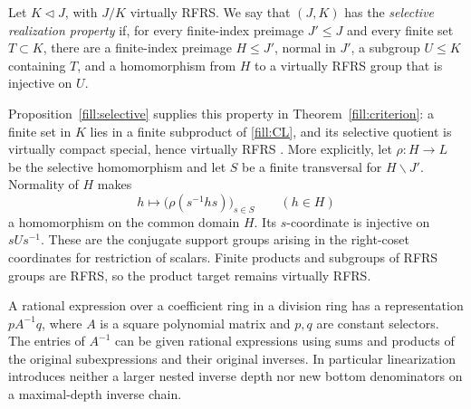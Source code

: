 \begin{definition}\label{fill:selective-input}
Let \(K\lhd J\), with \(J/K\) virtually RFRS.
We say that \((J,K)\) has the \emph{selective realization property} if,
for every finite-index preimage \(J'\le J\) and every finite set
\(T\subset K\), there are a finite-index preimage \(H\le J'\), normal
in \(J'\), a subgroup \(U\le K\) containing \(T\), and a homomorphism
from \(H\) to a virtually RFRS group that is injective on \(U\).
\end{definition}

Proposition~\ref{fill:selective} supplies this property in
Theorem~\ref{fill:criterion}: a finite set in \(K\) lies in a finite
subproduct of \eqref{fill:CL}, and its selective quotient is virtually
compact special, hence virtually RFRS \cite{Agol2008}.
More explicitly, let \(\rho:H\to L\) be the selective homomorphism
and let \(S\) be a finite transversal for \(H\backslash J'\).
Normality of \(H\) makes
\[
 h\longmapsto\bigl(\rho(s^{-1}hs)\bigr)_{s\in S}
 \qquad(h\in H)
\]
a homomorphism on the common domain \(H\). Its \(s\)-coordinate is
injective on \(sUs^{-1}\). These are the conjugate support groups
arising in the right-coset coordinates for restriction of scalars.
Finite products
and subgroups of RFRS groups are RFRS, so the product target remains
virtually RFRS.

\begin{lemma}\label{fill:linearize}
A rational expression over a coefficient ring in a division ring has
a representation \(pA^{-1}q\), where \(A\) is a square polynomial
matrix and \(p,q\) are constant selectors.  The entries of \(A^{-1}\)
can be given rational expressions using sums and products of the
original subexpressions and their original inverses.  In particular
linearization introduces neither a larger nested inverse depth nor
new bottom denominators on a maximal-depth inverse chain.
\end{lemma}

